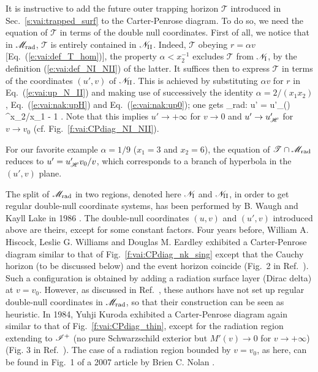 It is instructive to add the future outer trapping horizon $\mathscr{T}$
introduced in Sec.~\ref{s:vai:trapped_surf}
to the Carter-Penrose diagram. To do so, we need the equation of $\mathscr{T}$
in terms of the double null coordinates. First of all, we notice that in $\mathscr{M}_{\rm rad}$, $\mathscr{T}$ is
entirely contained in $\mathscr{N}_{\rm II}$. Indeed, $\mathscr{T}$ obeying
$r = \alpha v$ [Eq.~(\ref{e:vai:def_T_hom})], the property $\alpha < x_2^{-1}$
excludes $\mathscr{T}$ from $\mathscr{N}_{\rm I}$, by the definition
(\ref{e:vai:def_NI_NII}) of the latter. It suffices then to express  $\mathscr{T}$ in terms of the coordinates $(u',v)$ of  $\mathscr{N}_{\rm II}$.
This is achieved by substituting $\alpha v$ for $r$ in Eq.~(\ref{e:vai:up_N_II}) and making use of successively the identity $\alpha = 2/(x_1 x_2)$,
Eq.~(\ref{e:vai:nak:upH}) and Eq.~(\ref{e:vai:nak:up0}); one gets
\be \label{e:vai:eq_T_NII}
     \cap \M_{\rm rad}:\qquad
    u' = u'_\Hor \left(\right) ^{x_2/x_1 - 1} .
\ee
Note that this implies $u'\to +\infty$ for $v\to 0$ and
$u'\to u'_{\mathscr{H}}$ for $v\to v_0$ (cf. Fig.~\ref{f:vai:CPdiag_NI_NII}).
\begin{example}
For our favorite example $\alpha = 1/9$ ($x_1 = 3$ and $x_2 = 6$),
the equation of $\mathscr{T} \cap \mathscr{M}_{\rm rad}$ reduces
to $u' = u'_{\mathscr{H}} v_0/v$, which corresponds to a branch of hyperbola in the $(u',v)$ plane.
\end{example}

\begin{hist}
The split of $\mathscr{M}_{\rm rad}$ in two regions, denoted here $\mathscr{N}_{\rm I}$
and $\mathscr{N}_{\rm II}$, in order to get regular double-null coordinate
systems, has been performed by
B. Waugh and Kayll Lake in 1986 \cite{WaughL86}.
The double-null coordinates $(u,v)$ and $(u',v)$ introduced above are
theirs, except for some constant factors.
Four years before, William A. Hiscock, Leslie G. Williams and Douglas M. Eardley \cite{HiscoWE82}
exhibited a Carter-Penrose diagram similar to that of Fig.~\ref{f:vai:CPdiag_nk_sing}
except that
the Cauchy horizon (to be discussed below) and the event horizon coincide
(Fig.~2 in Ref.~\cite{HiscoWE82}). Such a configuration
is obtained by adding a radiation surface layer (Dirac delta) at $v=v_0$.
However, as discussed in Ref.~\cite{WaughL86}, these authors have not set up
regular double-null coordinates in $\mathscr{M}_{\rm rad}$, so that their construction
can be seen as heuristic. In 1984, Yuhji Kuroda \cite{Kurod84}
exhibited a Carter-Penrose diagram again similar to that of Fig.~\ref{f:vai:CPdiag_thin}, except
for the radiation region extending to $\mathscr{I}^+$ (no pure Schwarzschild exterior but
$M'(v) \to 0$ for $v\to +\infty$) (Fig. 3 in Ref.~\cite{Kurod84}). The case of a
radiation region bounded by $v = v_0$, as here, can be found in Fig.~1 of a 2007 article by
Brien C. Nolan \cite{Nolan07}.
\end{hist}


